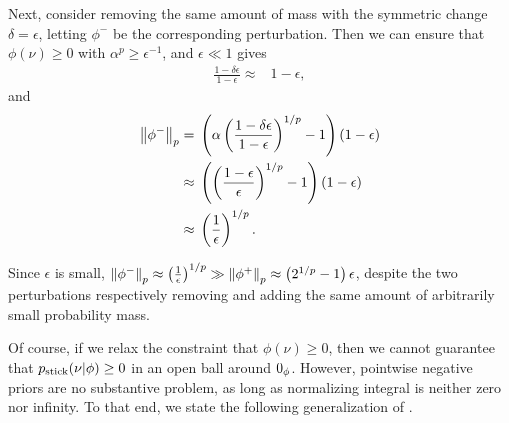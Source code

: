 \begin{ex}
Next, consider removing the same amount of mass with the symmetric change
$\delta = \epsilon$, letting $\phi^-$ be the corresponding perturbation. Then we
can ensure that $\phi(\nu) \ge 0$ with $\alpha^p \ge \epsilon^{-1}$, and
$\epsilon \ll 1$ gives
%
\begin{align*}
%
\frac{1-\delta\epsilon}{1 - \epsilon} \approx{}& 1- \epsilon,
%
\end{align*}
%
and
%
\begin{align*}
%
\norm{\phi^-}_p  ={}&
    \left( \alpha\left(\frac{1-\delta \epsilon}{1-\epsilon} \right)^{1/p} - 1
    \right) (1- \epsilon)
\\\approx{}&
\left(\left(\frac{1- \epsilon}{\epsilon}  \right)^{1/p} - 1\right)(1 - \epsilon)
%
\\\approx{}&
    \left( \frac{1}{\epsilon}\right)^{1/p}.
%
\end{align*}

Since $\epsilon$ is small, $\left\Vert\phi^-\right\Vert_p \approx \left(
\frac{1}{\epsilon}\right)^{1/p} \gg \left\Vert\phi^+\right\Vert_p \approx \left( 2^{1/p} - 1
\right) \epsilon$, despite the two perturbations respectively removing and
adding the same amount of arbitrarily small probability mass.

\end{ex}


Of course, if we relax the constraint that $\phi(\nu) \ge 0$, then we cannot
guarantee that $p_{\mathrm{stick}}(\nu \vert \phi) \ge 0$ in an open ball around $0_\phi$.
However, pointwise negative priors are no substantive problem, as long as
normalizing integral is neither zero nor infinity.  To that end, we state the
following generalization of \citep[Result 2]{gustafson:1996:local}.


